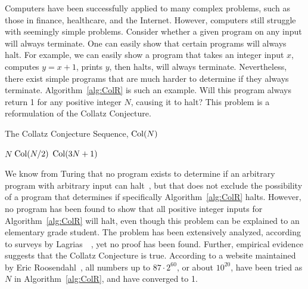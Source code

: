 Computers have been successfully applied to many complex problems, such as those in finance, healthcare, and the Internet. However, computers still struggle with seemingly simple problems. Consider whether a given program on any input will always terminate. One can easily show that certain programs will always halt. For example, we can easily show a program that takes an integer input $x$, computes $y=x+1$, prints $y$, then halts, will always terminate. Nevertheless, there exist simple programs that are much harder to determine if they always terminate. Algorithm~\ref{alg:ColR} is such an example. Will this program always return 1 for any positive integer $N$, causing it to halt? This problem is a reformulation of the Collatz Conjecture. \par
\begin{algorithm} 
\caption{The Collatz Conjecture Sequence, $\mathrm{Col}(N)$}
\label{alg:ColR} 
\begin{algorithmic}[1]
     \Return $N$ 
    \EndIf
     \Return $\mathrm{Col}(N/2)$
    \EndIf
    \State \Return $\mathrm{Col}(3N + 1)$ 
\end{algorithmic}
\end{algorithm}
We know from Turing that no program exists to determine if an arbitrary program with arbitrary input can halt~\cite{Turing1936}, but that does not exclude the possibility of a program that determines if specifically Algorithm~\ref{alg:ColR} halts. However, no program has been found to show that all positive integer inputs for Algorithm~\ref{alg:ColR} will halt, even though this problem can be explained to an elementary grade student. The problem has been extensively analyzed, according to surveys by Lagrias~\cite{2003mathLagrais}~\cite{2006mathLagrias}, yet no proof has been found. Further, empirical evidence suggests that the Collatz Conjecture is true. According to a website maintained by Eric Roosendahl~\cite{EricRoose}, all numbers up to $87 \cdot 2^{60}$, or about $10^{20}$, have been tried as $N$ in Algorithm~\ref{alg:ColR}, and have converged to 1. \par
